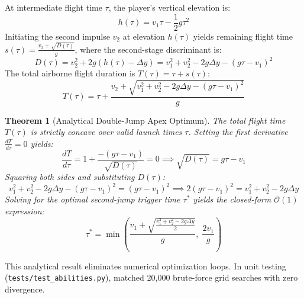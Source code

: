 \documentclass[11pt,a4paper]{report}
\newtheorem{theorem}{Theorem}[chapter]
\theoremstyle{definition}
\theoremstyle{remark}
\begin{document}
At intermediate flight time $\tau$, the player's vertical elevation is:
\begin{equation}
    h(\tau) = v_1 \tau - \frac{1}{2} g \tau^2
\end{equation}
Initiating the second impulse $v_2$ at elevation $h(\tau)$ yields remaining flight time $s(\tau) = \frac{v_2 + \sqrt{D(\tau)}}{g}$, where the second-stage discriminant is:
\begin{equation}
    D(\tau) = v_2^2 + 2g(h(\tau) - \Delta y) = v_1^2 + v_2^2 - 2g\Delta y - (g\tau - v_1)^2
\end{equation}
The total airborne flight duration is $T(\tau) = \tau + s(\tau)$:
\begin{equation}
    T(\tau) = \tau + \frac{v_2 + \sqrt{v_1^2 + v_2^2 - 2g\Delta y - (g\tau - v_1)^2}}{g}
\end{equation}

\begin{theorem}[Analytical Double-Jump Apex Optimum]
The total flight time $T(\tau)$ is strictly concave over valid launch times $\tau$. Setting the first derivative $\frac{dT}{d\tau} = 0$ yields:
\begin{equation}
    \frac{dT}{d\tau} = 1 + \frac{-(g\tau - v_1)}{\sqrt{D(\tau)}} = 0 \implies \sqrt{D(\tau)} = g\tau - v_1
\end{equation}
Squaring both sides and substituting $D(\tau)$:
\begin{equation}
    v_1^2 + v_2^2 - 2g\Delta y - (g\tau - v_1)^2 = (g\tau - v_1)^2 \implies 2(g\tau - v_1)^2 = v_1^2 + v_2^2 - 2g\Delta y
\end{equation}
Solving for the optimal second-jump trigger time $\tau^*$ yields the closed-form $\mathcal{O}(1)$ expression:
\begin{equation}
    \tau^* = \min\left( \frac{v_1 + \sqrt{\frac{v_1^2 + v_2^2 - 2g\Delta y}{2}}}{g}, \;\frac{2v_1}{g} \right)
    \label{eq:double_jump_opt}
\end{equation}
\end{theorem}
This analytical result eliminates numerical optimization loops. In unit testing (\texttt{tests/test\_abilities.py}),  matched 20,000 brute-force grid searches with zero divergence.
\end{document}
